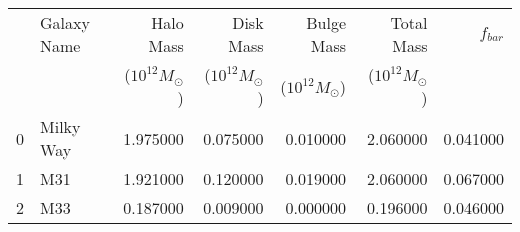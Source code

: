 \documentclass{article}
\begin{document}
\begin{tabular}{llrrrrr}
\toprule
 & Galaxy Name & Halo Mass & Disk Mass & Bulge Mass & Total Mass & $f_{bar}$ \\
 & & ($10^{12}M_{\odot}$) & ($10^{12}M_{\odot}$) & ($10^{12}M_{\odot}$) & ($10^{12}M_{\odot}$) & \\
\midrule
0 & Milky Way & 1.975000 & 0.075000 & 0.010000 & 2.060000 & 0.041000 \\
1 & M31 & 1.921000 & 0.120000 & 0.019000 & 2.060000 & 0.067000 \\
2 & M33 & 0.187000 & 0.009000 & 0.000000 & 0.196000 & 0.046000 \\
\bottomrule
\end{tabular}
\end{document}
